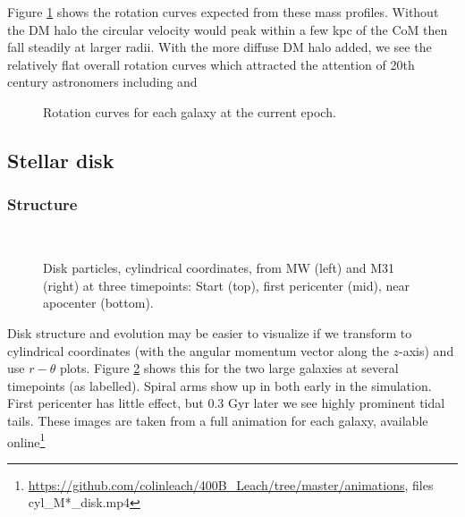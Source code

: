 \documentclass[twocolumn]{aastex63}
\newcommand{\todo}{\color{red}{TODO}\color{black}\hspace{2mm}}
\begin{document}
Figure \ref{fig:rotcurve0} shows the rotation curves expected from these mass profiles. Without the DM halo the circular velocity would peak within a few kpc of the CoM then fall steadily at larger radii. With the more diffuse DM halo added, we see the relatively flat overall rotation curves which attracted the attention of 20th century astronomers including \citet{zwicky_rotverschiebung_1933} and \citet{rubin_rotation_1970}

\begin{figure}[!bht!]
	\caption{Rotation curves for each galaxy at the current epoch.
		\label{fig:rotcurve0}}
\end{figure}

\subsection{Stellar disk}

\subsubsection{Structure}

\todo{identify the bar?}\ 

\todo{more on spiral arms}


\begin{figure}[!bht]
	\vspace{-7mm}
	\vspace{-7mm}
	\vspace{-7mm}
	\caption{Disk particles, cylindrical coordinates, from MW (left) and M31 (right) at three timepoints: Start (top), first pericenter (mid), near apocenter (bottom).
		\label{fig:6cyl}}
\end{figure}


Disk structure and evolution may be easier to visualize if we transform to cylindrical coordinates (with the angular momentum vector along the $z$-axis) and use $r-\theta$ plots. Figure \ref{fig:6cyl} shows this for the two large galaxies at several timepoints (as labelled).  Spiral arms show up in both early in the simulation. First pericenter has little effect, but 0.3 Gyr later we see highly prominent tidal tails. These images are taken from a full animation for each galaxy, available online\footnote{\url{https://github.com/colinleach/400B_Leach/tree/master/animations}, files cyl\_M*\_disk.mp4 }
\end{document}
